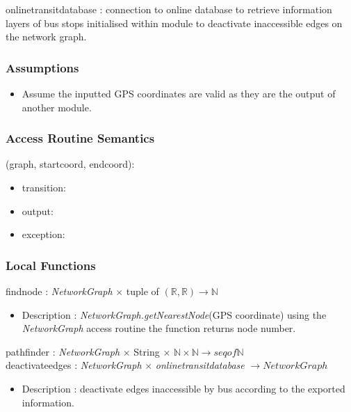 \documentclass[12pt, titlepage]{article}
\begin{document}
onlinetransitdatabase : connection to online database to retrieve information layers of bus stops initialised within module to deactivate inaccessible edges on the network graph.

\subsubsection{Assumptions}

\begin{itemize}
    \item Assume the inputted GPS coordinates are valid as they are the output of another module.
\end{itemize}

\subsubsection{Access Routine Semantics}

\noindent {}(graph, startcoord, endcoord):
\begin{itemize}
\item transition:  
\item output:  
\item exception:  
\end{itemize}

\subsubsection{Local Functions}

findnode : \emph{NetworkGraph} $\times$ tuple of $(\mathbb{R}, \mathbb{R})  \rightarrow \mathbb{N}$
\begin{itemize}
    \item Description : \emph{NetworkGraph.getNearestNode}(GPS coordinate) using the \emph{NetworkGraph} access routine the function returns node number.
\end{itemize}
pathfinder : \emph{NetworkGraph} $\times$ String $\times$ $\mathbb{N} \times \mathbb{N}  \rightarrow seq of \mathbb{N}$\\
deactivateedges : \emph{NetworkGraph} $\times$ \emph{onlinetransitdatabase} $ \rightarrow NetworkGraph$
\begin{itemize}
    \item Description : deactivate edges inaccessible by bus according to the exported information.
\end{itemize}
\newpage
\end{document}
